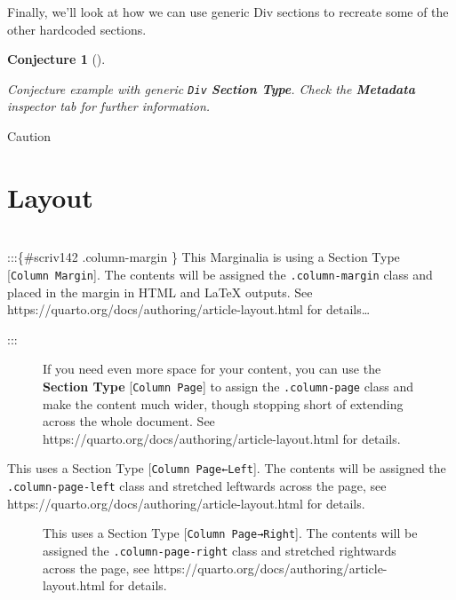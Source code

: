 \documentclass[
  12pt,
  a4paper,
  oneside,
  titlepage,
  toclink=all,
  toc=bibliography]{scrbook}
\theoremstyle{definition}
\theoremstyle{plain}
\theoremstyle{plain}
\newtheorem{conjecture}{Conjecture}[section]
\theoremstyle{plain}
\theoremstyle{plain}
\theoremstyle{definition}
\theoremstyle{definition}
\theoremstyle{plain}
\theoremstyle{remark}
\begin{document}
\protect\hypertarget{scriv137}{}{}

Finally, we'll look at how we can use generic Div sections to recreate
some of the other hardcoded sections.

\begin{conjecture}[]\protect\hypertarget{cnj-scriv139}{}\label{cnj-scriv139}

Conjecture example with generic \texttt{Div} \textbf{Section Type}.
Check the \textbf{Metadata} inspector tab for further information.

\end{conjecture}

Caution

\hypertarget{sec-scriv141}{%
\section{Layout}\label{sec-scriv141}}

\protect\hypertarget{scriv141}{}{}\strut \\
:::\{\#scriv142 .column-margin \} This Marginalia is using a Section
Type {[}\texttt{Column\ Margin}{]}. The contents will be assigned the
\texttt{.column-margin} class and placed in the margin in HTML and LaTeX
outputs. See https://quarto.org/docs/authoring/article-layout.html for
details\ldots{}

:::

\hypertarget{scriv143}{}
\begin{figure}

If you need even more space for your content, you can use the
\textbf{Section Type }{[}\texttt{Column\ Page}{]} to assign the
\texttt{.column-page} class and make the content much wider, though
stopping short of extending across the whole document. See
https://quarto.org/docs/authoring/article-layout.html for details.

\end{figure}

\leavevmode{}%
This uses a Section Type {[}\texttt{Column\ Page←Left}{]}. The contents
will be assigned the \texttt{.column-page-left} class and stretched
leftwards across the page, see
https://quarto.org/docs/authoring/article-layout.html for details.

\hypertarget{scriv145}{}
\begin{figure}

This uses a Section Type {[}\texttt{Column\ Page→Right}{]}. The contents
will be assigned the \texttt{.column-page-right} class and stretched
rightwards across the page, see
https://quarto.org/docs/authoring/article-layout.html for details.

\end{figure}
\end{document}
